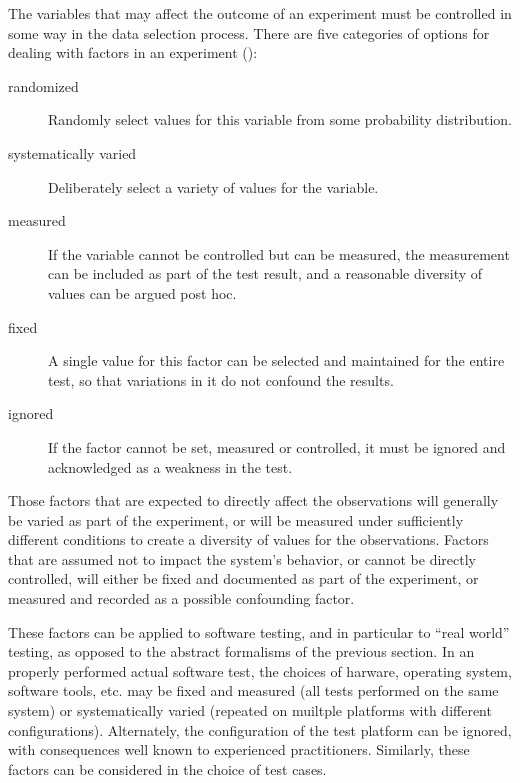 
The variables that may affect the outcome of an experiment
must be controlled in some way in the data selection process.
There are five categories of options for dealing with factors in an experiment (\cite{Holt1982}):
\begin{description}
\item[randomized]{Randomly select values for this variable 
from some probability distribution.}
\item[systematically varied]{Deliberately select a variety of values for the variable.}
\item[measured]{If the variable cannot be controlled but can be measured,
the measurement can be included as part of the test result,
and a reasonable diversity of values can be argued post hoc.}
\item[fixed]{A single value for this factor can be selected and maintained for the entire test,
so that variations in it do not confound the results.}
\item[ignored]{If the factor cannot be set, measured or controlled, 
it must be ignored and acknowledged as a weakness in the test.}
\end{description}
\noindent
Those factors that are expected to directly affect the observations
will generally be varied as part of the experiment,
or will be measured under sufficiently different conditions
to create a diversity of values for the observations.
Factors that are assumed not to impact the system's behavior,
or cannot be directly controlled,
will either be fixed and documented as part of the experiment,
or measured and recorded as a possible confounding factor.

These factors can be applied to software testing,
and in particular to ``real world'' testing,
as opposed to the abstract formalisms of the previous section.
In an properly performed actual software test,
the choices of harware, operating system, software tools, etc.
may be fixed and measured (all tests performed on the same system)
or systematically varied (repeated on muiltple platforms with different configurations).
Alternately, the configuration of the test platform can be ignored,
with consequences well known to experienced practitioners.
Similarly, these factors can be considered in the choice of test cases.

